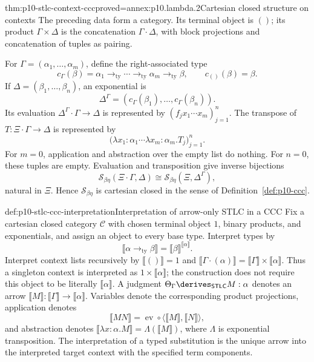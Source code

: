 \begin{hbtheorem}{thm:p10-stlc-context-ccc}{proved=annex:p10.lambda.2}{Cartesian closed structure on contexts}
The preceding data form a category.
Its terminal object is \(()\); its product
\(\Gamma\times\Delta\) is the concatenation \(\Gamma\cdot\Delta\),
with block projections and concatenation of tuples as pairing.

For \(\Gamma=(\alpha_1,\ldots,\alpha_m)\), define the
right-associated type
\[
 c_\Gamma(\beta)=
 \alpha_1\mathbin{\to_{\mathrm{ty}}}\cdots
 \mathbin{\to_{\mathrm{ty}}}\alpha_m
 \mathbin{\to_{\mathrm{ty}}}\beta,
 \qquad c_{()}(\beta)=\beta.
\]
If \(\Delta=(\beta_1,\ldots,\beta_n)\), an exponential is
\[
       \Delta^\Gamma=(c_\Gamma(\beta_1),\ldots,c_\Gamma(\beta_n)).
\]
Its evaluation
\(\Delta^\Gamma\cdot\Gamma\to\Delta\) is represented by
\((f_jx_1\cdots x_m)_{j=1}^n\).
The transpose of \(T:\Xi\cdot\Gamma\to\Delta\) is represented by
\[
       \bigl(\lambda x_1{:}\alpha_1\cdots
                       \lambda x_m{:}\alpha_m.T_j\bigr)_{j=1}^n.
\]
For \(m=0\), application and abstraction over the empty list
do nothing.  For \(n=0\), these tuples are empty.
Evaluation and transposition give inverse bijections
\[
 \mathcal S_{\beta\eta}(\Xi\cdot\Gamma,\Delta)
       \cong
 \mathcal S_{\beta\eta}(\Xi,\Delta^\Gamma),
\]
natural in \(\Xi\).  Hence \(\mathcal S_{\beta\eta}\) is
cartesian closed in the sense of Definition~\ref{def:p10-ccc}.
\end{hbtheorem}

\begin{hbdefinition}{def:p10-stlc-ccc-interpretation}{Interpretation of arrow-only STLC in a CCC}
Fix a cartesian closed category \(\mathcal C\) with chosen
terminal object \(1\), binary products, and exponentials, and
assign an object to every base type.  Interpret types by
\[
 \llbracket\alpha\mathbin{\to_{\mathrm{ty}}}\beta\rrbracket
       =\llbracket\beta\rrbracket^{\llbracket\alpha\rrbracket}.
\]
Interpret context lists recursively by
\(\llbracket()\rrbracket=1\) and
\(\llbracket\Gamma\cdot(\alpha)\rrbracket
 =\llbracket\Gamma\rrbracket\times\llbracket\alpha\rrbracket\).
Thus a singleton context is interpreted as
\(1\times\llbracket\alpha\rrbracket\); the construction does
not require this object to be literally
\(\llbracket\alpha\rrbracket\).
A judgment \(\Theta_\Gamma\derives_{\mathsf{STLC}}M:\alpha\)
denotes an arrow
\(\llbracket M\rrbracket:
 \llbracket\Gamma\rrbracket\to\llbracket\alpha\rrbracket\).
Variables denote the corresponding product projections,
application denotes
\[
 \llbracket MN\rrbracket
      =\operatorname{ev}\circ
           \langle\llbracket M\rrbracket,\llbracket N\rrbracket\rangle,
\]
and abstraction denotes
\(\llbracket\lambda x{:}\alpha.M\rrbracket
  =\Lambda(\llbracket M\rrbracket)\), where \(\Lambda\) is
exponential transposition.
The interpretation of a typed substitution is the unique
arrow into the interpreted target context with the specified
term components.
\end{hbdefinition}

